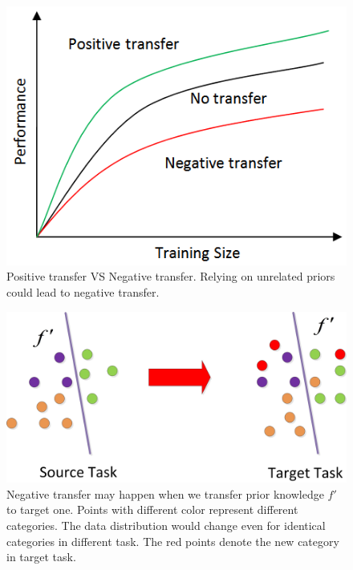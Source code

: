\begin{figure}
\centering
\includegraphics[scale=.5]{fig/negative.png}
\caption{Positive transfer VS Negative transfer. Relying on unrelated priors could lead to negative transfer.}\label{fig:neg}
\end{figure}
\begin{figure}
\centering
\includegraphics[scale=.4]{fig/domain.jpg}
\caption{Negative transfer may happen when we transfer prior knowledge $f'$ to target one. Points with different color represent different categories. The data distribution would change even for identical categories in different task. The red points denote the new category in target task. }\label{fig:distribution}
\end{figure}

